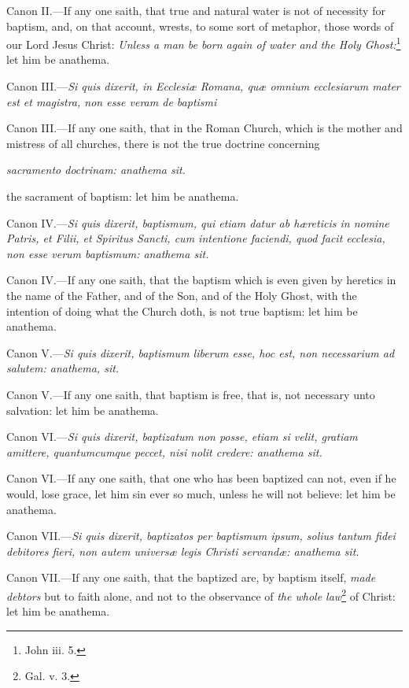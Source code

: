 Canon II.—If any one saith, that true and natural water is not of necessity for baptism, and, on that account, wrests, to some sort of metaphor, those words of our Lord Jesus Christ: \emph{Unless a man be born again of water and the Holy Ghost:}\footnote{\par   John iii. 5.} let him be anathema.

Canon III.—\emph{Si quis dixerit, in Ecclesiæ Romana, quæ omnium ecclesiarum mater est et magistra, non esse veram de baptismi }

Canon III.—If any one saith, that in the Roman Church, which is the mother and mistress of all churches, there is not the true doctrine concerning

\emph{sacramento doctrinam: anathema sit.}

the sacrament of baptism: let him be anathema.

Canon IV.—\emph{Si quis dixerit, baptismum, qui etiam datur ab hæreticis in nomine Patris, et Filii, et Spiritus Sancti, cum intentione faciendi, quod facit ecclesia, non esse verum baptismum: anathema sit.}

Canon IV.—If any one saith, that the baptism which is even given by heretics in the name of the Father, and of the Son, and of the Holy Ghost, with the intention of doing what the Church doth, is not true baptism: let him be anathema.

Canon V.—\emph{Si quis dixerit, baptismum liberum esse, hoc est, non necessarium ad salutem: anathema, sit.}

Canon V.—If any one saith, that baptism is free, that is, not necessary unto salvation: let him be anathema.

Canon VI.—\emph{Si quis dixerit, baptizatum non posse, etiam si velit, gratiam amittere, quantumcumque peccet, nisi nolit credere: anathema sit.}

Canon VI.—If any one saith, that one who has been baptized can not, even if he would, lose grace, let him sin ever so much, unless he will not believe: let him be anathema.

Canon VII.—\emph{Si quis dixerit, baptizatos per baptismum ipsum, solius tantum fidei debitores fieri, non autem universæ legis Christi servandæ: anathema sit.}

Canon VII.—If any one saith, that the baptized are, by baptism itself, \emph{made debtors} but to faith alone, and not to the observance of \emph{the whole law}\footnote{\par  Gal. v. 3.} of Christ: let him be anathema.

